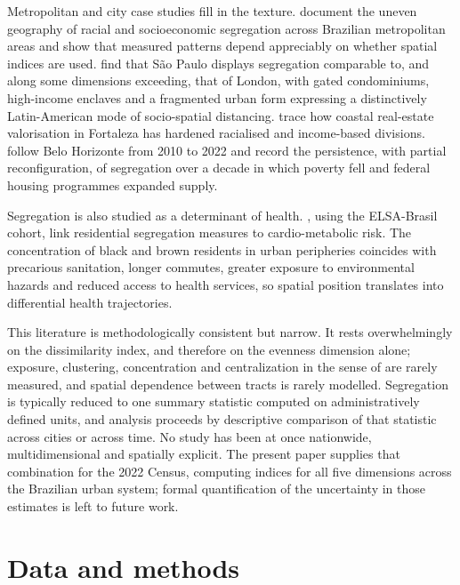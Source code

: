 \documentclass[12pt,a4paper]{article}
\begin{document}
Metropolitan and city case studies fill in the texture. \citet{barros2018unevengeographies} document the uneven geography of racial and socioeconomic segregation across Brazilian metropolitan areas and show that measured patterns depend appreciably on whether spatial indices are used. \citet{barros2024saopaulolondres} find that S\~ao Paulo displays segregation comparable to, and along some dimensions exceeding, that of London, with gated condominiums, high-income enclaves and a fragmented urban form expressing a distinctively Latin-American mode of socio-spatial distancing. \citet{danilofranca2022fortaleza} trace how coastal real-estate valorisation in Fortaleza has hardened racialised and income-based divisions. \citet{strauch2026bh20102022} follow Belo Horizonte from 2010 to 2022 and record the persistence, with partial reconfiguration, of segregation over a decade in which poverty fell and federal housing programmes expanded supply.

Segregation is also studied as a determinant of health. \citet{barber2018cardioelsa}, using the ELSA-Brasil cohort, link residential segregation measures to cardio-metabolic risk. The concentration of black and brown residents in urban peripheries coincides with precarious sanitation, longer commutes, greater exposure to environmental hazards and reduced access to health services, so spatial position translates into differential health trajectories.

This literature is methodologically consistent but narrow. It rests overwhelmingly on the dissimilarity index, and therefore on the evenness dimension alone; exposure, clustering, concentration and centralization in the sense of \citet{massey1988dimensions} are rarely measured, and spatial dependence between tracts is rarely modelled. Segregation is typically reduced to one summary statistic computed on administratively defined units, and analysis proceeds by descriptive comparison of that statistic across cities or across time. No study has been at once nationwide, multidimensional and spatially explicit. The present paper supplies that combination for the 2022 Census, computing indices for all five dimensions across the Brazilian urban system; formal quantification of the uncertainty in those estimates is left to future work.

\section{Data and methods}\label{sec:methods}
\end{document}
